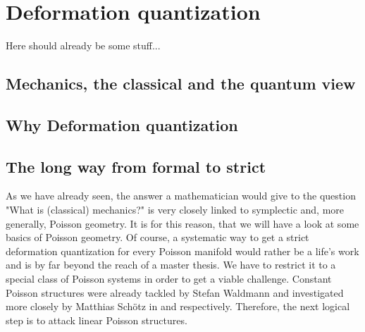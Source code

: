 
%
%

\chapter{Deformation quantization}

Here should already be some stuff...


\section{Mechanics, the classical and the quantum view}
\label{sec:chap2_Mechanics}


\section{Why Deformation quantization}
\label{sec:chap2_Deformation}


\section{The long way from formal to strict}
\label{sec:chap2_FormalStrict}

As we have already seen, the answer a mathematician would give to the question "What is (classical) mechanics?" is very closely linked to symplectic and, more generally, Poisson geometry. It is for this reason, that we will have a look at some basics of Poisson geometry. Of course, a systematic way to get a strict deformation quantization for every Poisson manifold would rather be a life's work and is by far beyond the reach of a master thesis. We have to restrict it to a special class of Poisson systems in order to get a viable challenge. Constant Poisson structures were already tackled by Stefan Waldmann and investigated more closely by Matthias Schötz in  and  respectively. Therefore, the next logical step is to attack linear Poisson structures.